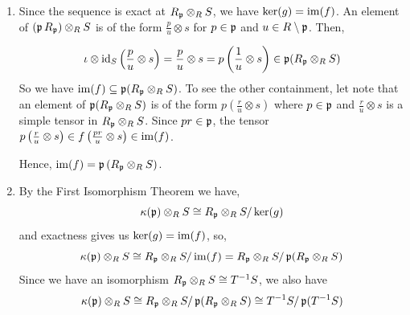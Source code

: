 \documentclass[Notebook.tex]{subfiles}
\begin{document}
\begin{solution}
\begin{enumerate}
        \item Since the sequence is exact at $R_{\fp} \otimes_R S$, we have $\ker(g) = \im(f)$. An element of $(\fp R_{\fp}) \otimes_R S$ is of the form $\frac{p}{u} \otimes s$ for $p \in \fp$ and $u \in R \setminus \fp$. Then, 
        
        \[\iota \otimes \id_S \left(\frac{p}{u} \otimes s\right) = \frac{p}{u} \otimes s = p \left(\frac{1}{u} \otimes s\right) \in \fp (R_{\fp} \otimes_R S)\]
        So we have $\im(f) \subseteq \fp (R_{\fp} \otimes_R S)$. To see the other containment, let note that an element of $\fp (R_{\fp} \otimes_R S)$ is of the form $p \left(\frac{r}{u} \otimes s\right)$ where $p \in \fp$ and $\frac{r}{u} \otimes s$ is a simple tensor in $R_{\fp} \otimes_R S$. Since $pr \in \fp$, the tensor $p \left(\frac{r}{u} \otimes s\right) \in f\left(\frac{pr}{u} \otimes s\right) \in \im(f)$. 

        Hence, $\im(f) = \fp \left(R_{\fp} \otimes_R S\right)$. 

        \item By the First Isomorphism Theorem we have, 
        \[\kappa(\fp) \otimes_R S \iso R_{\fp} \otimes_R S/\ker(g)\]
        and exactness gives us $\ker(g) = \im(f)$, so,
        \[\kappa(\fp) \otimes_R S \iso R_{\fp} \otimes_R S/\im(f) = R_{\fp} \otimes_R S / \fp(R_{\fp} \otimes_R S)\]
        Since we have an isomorphism $R_{\fp} \otimes_R S \iso T^{-1}S$, we also have
        \[\kappa(\fp) \otimes_R S \iso R_{\fp} \otimes_R S / \fp(R_{\fp} \otimes_R S) \iso T^{-1}S / \fp(T^{-1}S)\]
     \end{enumerate}    
\end{solution}

\newpage 
\end{document}
